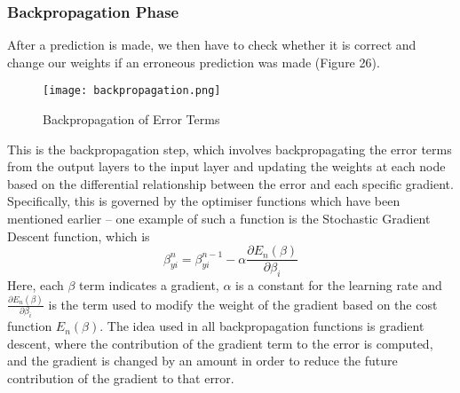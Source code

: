 \documentclass{article}
\begin{document}
\subsubsection{Backpropagation Phase}
After a prediction is made, we then have to check whether it is correct and change our weights if an erroneous prediction was made (Figure 26).
\begin{figure}[H]
\centering
\texttt{[image: backpropagation.png]}
\caption{Backpropagation of Error Terms}
\end{figure}
This is the backpropagation step, which involves backpropagating the error terms from the output layers to the input layer and updating the weights at each node based on the differential relationship between the error and each specific gradient. Specifically, this is governed by the optimiser functions which have been mentioned earlier -- one example of such a function is the Stochastic Gradient Descent function, which is 
\begin{equation}
\beta^n_{yi} = \beta^{n-1}_{yi} - \alpha \frac{\partial{E_n}(\beta)}{\partial{\beta_i}}
\end{equation}
Here, each $\beta$ term indicates a gradient, $\alpha$ is a constant for the learning rate and $\frac{\partial{E_n}(\beta)}{\partial{\beta_i}}$ is the term used to modify the weight of the gradient based on the cost function ${E_n}(\beta)$. The idea used in all backpropagation functions is gradient descent, where the contribution of the gradient term to the error is computed, and the gradient is changed by an amount in order to reduce the future contribution of the gradient to that error. 
\end{document}
